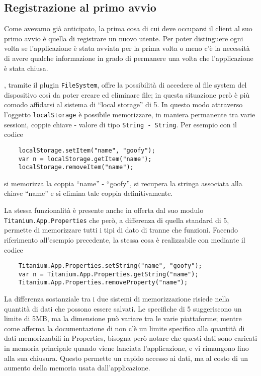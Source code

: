 			
		\subsection{Registrazione al primo avvio}
			Come avevamo già anticipato, la prima cosa di cui deve occuparsi
			il client al suo primo avvio è quella di registrare un nuovo utente. Per
			poter distinguere ogni volta se l'applicazione è stata avviata 
			per la prima volta o meno c'è la
			necessità di avere qualche informazione in grado di permanere una volta
			che l'applicazione è stata chiusa.
			
			\pg{}, tramite il plugin
			\texttt{FileSystem}, offre la possibilità di accedere al file system
			del dispositivo così da poter creare ed	eliminare file; in questa
			situazione però è più comodo affidarsi al sistema di ``lo\-cal stor\-age''
			di \html{}5. In questo modo attraverso l'oggetto \js{} \texttt{localStorage}
			è possibile memorizzare, in maniera permanente tra varie sessioni, coppie
			chiave - valore di tipo \texttt{String - String}. Per esempio con il
			codice
			\begin{lstlisting}
	localStorage.setItem("name", "goofy");
	var n = localStorage.getItem("name");
	localStorage.removeItem("name");
			\end{lstlisting}
			si memorizza la coppia ``name'' - ``goofy'', si recupera la stringa associata
			alla chiave ``name'' e si elimina tale coppia definitivamente.
			
			La stessa funzionalità è presente anche in \tisdk{} offerta dal suo
			modulo \texttt{Titanium.App.Properties} che però, a differenza di
			quella standard di \html{}5, permette di memorizzare tutti i tipi di
			dato di \js{} tranne che funzioni. Facendo riferimento all'esempio 
			precedente, la stessa cosa è realizzabile con \tisdk mediante il
			codice
			\begin{lstlisting}
	Titanium.App.Properties.setString("name", "goofy");
	var n = Titanium.App.Properties.getString("name");
	Titanium.App.Properties.removeProperty("name");
			\end{lstlisting}

			La differenza sostanziale tra i due sistemi di memorizzazione risiede 
			nella quantità di dati che possono essere salvati. 
			Le specifiche di \html{}5 suggeriscono un limite di 5MB, ma la dimensione 
			può variare tra le varie piattaforme; mentre come afferma la documentazione 
			di \tisdk{} non c'è un limite specifico alla quantità di dati memorizzabili
			in Properties, bisogna però notare che questi dati sono caricati in 
			memoria principale quando 
			viene lanciata l'applicazione, e vi rimangono fino alla sua chiusura.
			Questo permette un rapido accesso ai dati, ma al costo di un aumento 
			della memoria usata dall'applicazione. 
			
